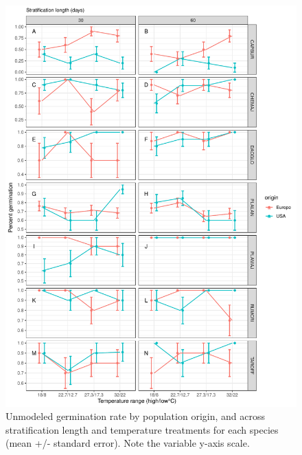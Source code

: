 \documentclass[12pt]{article}\usepackage[]{graphicx}\usepackage[]{color}
\begin{document}
\begin{figure}[H]
  \centering
  \includegraphics[scale=.8]{figure5}  %
  \caption{Unmodeled germination rate by population origin, and across stratification length and temperature treatments for each species (mean +/- standard error). Note the variable y-axis scale.} \label{fig:rawrate}
\end{figure}
\end{document}
